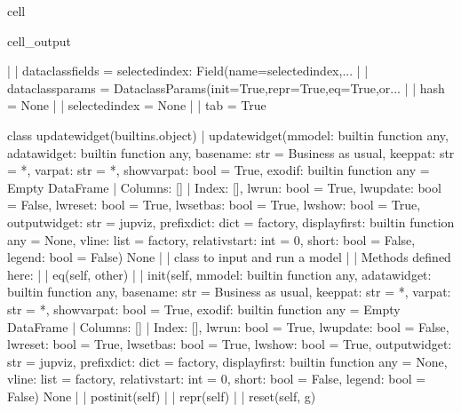 \documentclass[letterpaper,10pt,english]{jupyterBook}
\begin{document}
\begin{sphinxuseclass}{cell}
\begin{sphinxVerbatimOutput}
\begin{sphinxuseclass}{cell_output}
\begin{sphinxVerbatim}[commandchars=\\\{\}]
     |  
     |  \PYGZus{}\PYGZus{}dataclass\PYGZus{}fields\PYGZus{}\PYGZus{} = \PYGZob{}\PYGZsq{}selected\PYGZus{}index\PYGZsq{}: Field(name=\PYGZsq{}selected\PYGZus{}index\PYGZsq{},...
     |  
     |  \PYGZus{}\PYGZus{}dataclass\PYGZus{}params\PYGZus{}\PYGZus{} = \PYGZus{}DataclassParams(init=True,repr=True,eq=True,or...
     |  
     |  \PYGZus{}\PYGZus{}hash\PYGZus{}\PYGZus{} = None
     |  
     |  selected\PYGZus{}index = None
     |  
     |  tab = True
    
    class updatewidget(builtins.object)
     |  updatewidget(mmodel: \PYGZlt{}built\PYGZhy{}in function any\PYGZgt{}, a\PYGZus{}datawidget: \PYGZlt{}built\PYGZhy{}in function any\PYGZgt{}, basename: str = \PYGZsq{}Business as usual\PYGZsq{}, keeppat: str = \PYGZsq{}*\PYGZsq{}, varpat: str = \PYGZsq{}*\PYGZsq{}, showvarpat: bool = True, exodif: \PYGZlt{}built\PYGZhy{}in function any\PYGZgt{} = Empty DataFrame
     |  Columns: []
     |  Index: [], lwrun: bool = True, lwupdate: bool = False, lwreset: bool = True, lwsetbas: bool = True, lwshow: bool = True, outputwidget: str = \PYGZsq{}jupviz\PYGZsq{}, prefix\PYGZus{}dict: dict = \PYGZlt{}factory\PYGZgt{}, display\PYGZus{}first: \PYGZlt{}built\PYGZhy{}in function any\PYGZgt{} = None, vline: list = \PYGZlt{}factory\PYGZgt{}, relativ\PYGZus{}start: int = 0, short: bool = False, legend: bool = False) \PYGZhy{}\PYGZgt{} None
     |  
     |  class to input and run a model
     |  
     |  Methods defined here:
     |  
     |  \PYGZus{}\PYGZus{}eq\PYGZus{}\PYGZus{}(self, other)
     |  
     |  \PYGZus{}\PYGZus{}init\PYGZus{}\PYGZus{}(self, mmodel: \PYGZlt{}built\PYGZhy{}in function any\PYGZgt{}, a\PYGZus{}datawidget: \PYGZlt{}built\PYGZhy{}in function any\PYGZgt{}, basename: str = \PYGZsq{}Business as usual\PYGZsq{}, keeppat: str = \PYGZsq{}*\PYGZsq{}, varpat: str = \PYGZsq{}*\PYGZsq{}, showvarpat: bool = True, exodif: \PYGZlt{}built\PYGZhy{}in function any\PYGZgt{} = Empty DataFrame
     |  Columns: []
     |  Index: [], lwrun: bool = True, lwupdate: bool = False, lwreset: bool = True, lwsetbas: bool = True, lwshow: bool = True, outputwidget: str = \PYGZsq{}jupviz\PYGZsq{}, prefix\PYGZus{}dict: dict = \PYGZlt{}factory\PYGZgt{}, display\PYGZus{}first: \PYGZlt{}built\PYGZhy{}in function any\PYGZgt{} = None, vline: list = \PYGZlt{}factory\PYGZgt{}, relativ\PYGZus{}start: int = 0, short: bool = False, legend: bool = False) \PYGZhy{}\PYGZgt{} None
     |  
     |  \PYGZus{}\PYGZus{}post\PYGZus{}init\PYGZus{}\PYGZus{}(self)
     |  
     |  \PYGZus{}\PYGZus{}repr\PYGZus{}\PYGZus{}(self)
     |  
     |  reset(self, g)

\end{sphinxVerbatim}
\end{sphinxuseclass}
\end{sphinxVerbatimOutput}
\end{sphinxuseclass}
\end{document}
